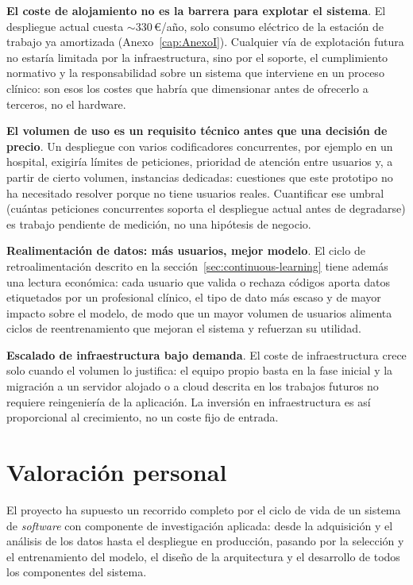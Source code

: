 \textbf{El coste de alojamiento no es la barrera para explotar el sistema}. El despliegue actual cuesta $\sim$330\,€/año, solo consumo eléctrico de la estación de trabajo ya amortizada (Anexo~\ref{cap:AnexoI}). Cualquier vía de explotación futura no estaría limitada por la infraestructura, sino por el soporte, el cumplimiento normativo y la responsabilidad sobre un sistema que interviene en un proceso clínico: son esos los costes que habría que dimensionar antes de ofrecerlo a terceros, no el hardware.

\textbf{El volumen de uso es un requisito técnico antes que una decisión de precio}. Un despliegue con varios codificadores concurrentes, por ejemplo en un hospital, exigiría límites de peticiones, prioridad de atención entre usuarios y, a partir de cierto volumen, instancias dedicadas: cuestiones que este prototipo no ha necesitado resolver porque no tiene usuarios reales. Cuantificar ese umbral (cuántas peticiones concurrentes soporta el despliegue actual antes de degradarse) es trabajo pendiente de medición, no una hipótesis de negocio.

\textbf{Realimentación de datos: más usuarios, mejor modelo}. El ciclo de retroalimentación descrito en la sección~\ref{sec:continuous-learning} tiene además una lectura económica: cada usuario que valida o rechaza códigos aporta datos etiquetados por un profesional clínico, el tipo de dato más escaso y de mayor impacto sobre el modelo, de modo que un mayor volumen de usuarios alimenta ciclos de reentrenamiento que mejoran el sistema y refuerzan su utilidad.

\textbf{Escalado de infraestructura bajo demanda}. El coste de infraestructura crece solo cuando el volumen lo justifica: el equipo propio basta en la fase inicial y la migración a un servidor alojado o a cloud descrita en los trabajos futuros no requiere reingeniería de la aplicación. La inversión en infraestructura es así proporcional al crecimiento, no un coste fijo de entrada.

\section{Valoración personal}

El proyecto ha supuesto un recorrido completo por el ciclo de vida de un sistema de \emph{software} con componente de investigación aplicada: desde la adquisición y el análisis de los datos hasta el despliegue en producción, pasando por la selección y el entrenamiento del modelo, el diseño de la arquitectura y el desarrollo de todos los componentes del sistema.

